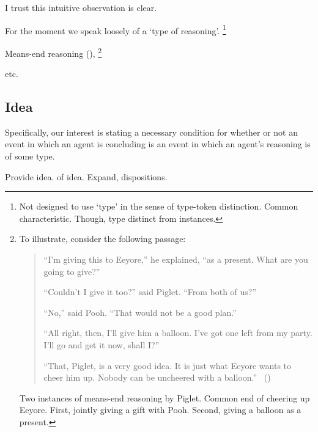 \begin{note}
  I trust this intuitive observation is clear.

  For the moment we speak loosely of a `type of reasoning'.%
  \footnote{
    Not designed to use `type' in the sense of type-token distinction.
    Common characteristic.
    Though, type distinct from instances.
  }

  Means-end reasoning (\cite[60]{Pollock:2002aa}),%
  \footnote{
    To illustrate, consider the following passage:
    \begin{quote}
    \indent ``I'm giving this to Eeyore,'' he explained, ``as a present.
    What are you going to give?''

    ``Couldn't I give it too?'' said Piglet.
    ``From both of us?''

    ``No,'' said Pooh.
    ``That would not be a good plan.''

    ``All right, then, I'll give him a balloon.
    I've got one left from my party.
    I'll go and get it now, shall I?''

    ``That, Piglet, is a very good idea.
    It is just what Eeyore wants to cheer him up.
    Nobody can be uncheered with a balloon.''%
    \mbox{ }\hfill\mbox{(\cite[78--79]{Milne:2009aa})}\newline
    \mbox{ }
  \end{quote}

  Two instances of means-end reasoning by Piglet.
  Common end of cheering up Eeyore.
  First, jointly giving a gift with Pooh.
  Second, giving a balloon as a present.
  }

  etc.
\end{note}

\subsection{Idea}
\label{sec:idea}

\begin{note}
  Specifically, our interest is stating a necessary condition for whether or not an event in which an agent is concluding is an event in which an agent's reasoning is of some type.

  Provide idea.
   of idea.
  Expand, dispositions.
\end{note}

